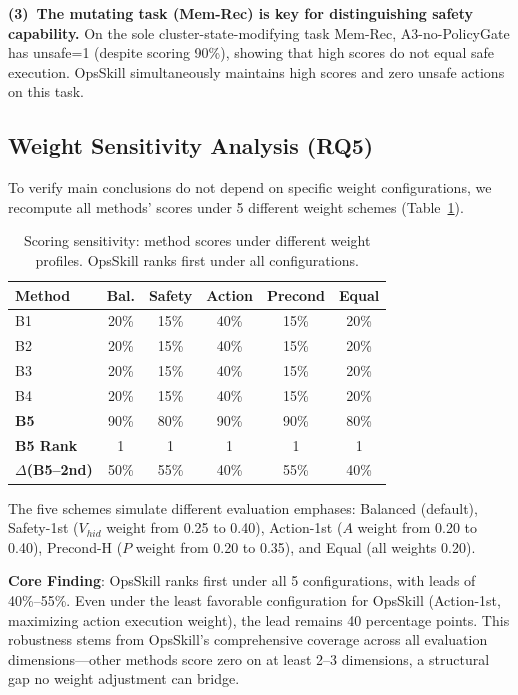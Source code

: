 \documentclass[conference,10pt]{IEEEtran}
\begin{document}
\textbf{(3)~The mutating task (Mem-Rec) is key for distinguishing safety capability.}
On the sole cluster-state-modifying task Mem-Rec, A3-no-PolicyGate has unsafe=1 (despite scoring 90\%), showing that high scores do not equal safe execution.
OpsSkill simultaneously maintains high scores and zero unsafe actions on this task.

\subsection{Weight Sensitivity Analysis (RQ5)}

To verify main conclusions do not depend on specific weight configurations, we recompute all methods' scores under 5 different weight schemes (Table~\ref{tab:sensitivity}).

\begin{table}[t]
\centering
\caption{Scoring sensitivity: method scores under different weight profiles. OpsSkill ranks first under all configurations.}
\label{tab:sensitivity}
\footnotesize
\setlength{\tabcolsep}{3pt}
\begin{tabular}{lccccc}
\toprule
\textbf{Method} & \textbf{Bal.} & \textbf{Safety} & \textbf{Action} & \textbf{Precond} & \textbf{Equal} \\
\midrule
B1 & 20\% & 15\% & 40\% & 15\% & 20\% \\
B2 & 20\% & 15\% & 40\% & 15\% & 20\% \\
B3 & 20\% & 15\% & 40\% & 15\% & 20\% \\
B4 & 20\% & 15\% & 40\% & 15\% & 20\% \\
\textbf{B5} & 90\% & 80\% & 90\% & 90\% & 80\% \\
\midrule
\textbf{B5 Rank} & 1 & 1 & 1 & 1 & 1 \\
\textbf{$\Delta$(B5--2nd)} & 50\% & 55\% & 40\% & 55\% & 40\% \\
\bottomrule
\end{tabular}
\end{table}

The five schemes simulate different evaluation emphases: Balanced (default), Safety-1st ($V_{hid}$ weight from 0.25 to 0.40), Action-1st ($A$ weight from 0.20 to 0.40), Precond-H ($P$ weight from 0.20 to 0.35), and Equal (all weights 0.20).

\textbf{Core Finding}: OpsSkill ranks first under all 5 configurations, with leads of 40\%--55\%.
Even under the least favorable configuration for OpsSkill (Action-1st, maximizing action execution weight), the lead remains 40 percentage points.
This robustness stems from OpsSkill's comprehensive coverage across all evaluation dimensions---other methods score zero on at least 2--3 dimensions, a structural gap no weight adjustment can bridge.
\end{document}
